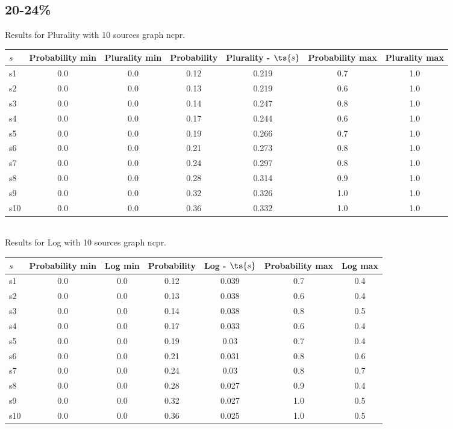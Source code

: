 \documentclass{article}
\begin{document}
\newpage

\subsection{20-24\%}

\noindent Results for Plurality with 10 sources graph ncpr.

\noindent\begin{tabular}{|l|c|c|c|c|c|c|}
\hline
$s$& Probability min & Plurality min & Probability & Plurality - $\ts{s}$ & Probability max & Plurality max\\
\hline
s1 &0.0 & 0.0 & 0.12 & 0.219 & 0.7 & 1.0\\
\hline
s2 &0.0 & 0.0 & 0.13 & 0.219 & 0.6 & 1.0\\
\hline
s3 &0.0 & 0.0 & 0.14 & 0.247 & 0.8 & 1.0\\
\hline
s4 &0.0 & 0.0 & 0.17 & 0.244 & 0.6 & 1.0\\
\hline
s5 &0.0 & 0.0 & 0.19 & 0.266 & 0.7 & 1.0\\
\hline
s6 &0.0 & 0.0 & 0.21 & 0.273 & 0.8 & 1.0\\
\hline
s7 &0.0 & 0.0 & 0.24 & 0.297 & 0.8 & 1.0\\
\hline
s8 &0.0 & 0.0 & 0.28 & 0.314 & 0.9 & 1.0\\
\hline
s9 &0.0 & 0.0 & 0.32 & 0.326 & 1.0 & 1.0\\
\hline
s10 &0.0 & 0.0 & 0.36 & 0.332 & 1.0 & 1.0\\
\hline
\end{tabular}\\

\noindent Results for Log with 10 sources graph ncpr.

\noindent\begin{tabular}{|l|c|c|c|c|c|c|}
\hline
$s$& Probability min & Log min & Probability & Log - $\ts{s}$ & Probability max & Log max\\
\hline
s1 &0.0 & 0.0 & 0.12 & 0.039 & 0.7 & 0.4\\
\hline
s2 &0.0 & 0.0 & 0.13 & 0.038 & 0.6 & 0.4\\
\hline
s3 &0.0 & 0.0 & 0.14 & 0.038 & 0.8 & 0.5\\
\hline
s4 &0.0 & 0.0 & 0.17 & 0.033 & 0.6 & 0.4\\
\hline
s5 &0.0 & 0.0 & 0.19 & 0.03 & 0.7 & 0.4\\
\hline
s6 &0.0 & 0.0 & 0.21 & 0.031 & 0.8 & 0.6\\
\hline
s7 &0.0 & 0.0 & 0.24 & 0.03 & 0.8 & 0.7\\
\hline
s8 &0.0 & 0.0 & 0.28 & 0.027 & 0.9 & 0.4\\
\hline
s9 &0.0 & 0.0 & 0.32 & 0.027 & 1.0 & 0.5\\
\hline
s10 &0.0 & 0.0 & 0.36 & 0.025 & 1.0 & 0.5\\
\hline
\end{tabular}\\
\end{document}
